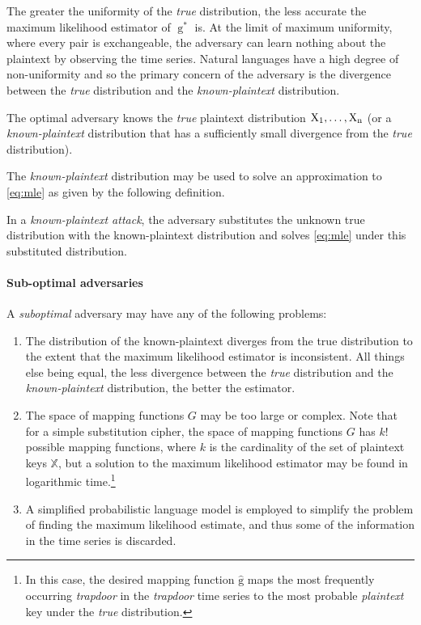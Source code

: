 \documentclass[ ../main.tex]{subfiles}
\begin{document}
The greater the uniformity of the \emph{true} distribution, the less accurate the maximum likelihood estimator of $\operatorname{g}^*$ is. At the limit of maximum uniformity, where every pair is exchangeable, the adversary can learn nothing about the plaintext by observing the time series. Natural languages have a high degree of non-uniformity and so the primary concern of the adversary is the divergence between the \emph{true} distribution and the \emph{known-plaintext} distribution.
\begin{assumption}
The optimal adversary knows the \emph{true} plaintext distribution $\mathrm{X_1},\ldots,\mathrm{X_n}$ (or a \emph{known-plaintext} distribution that has a sufficiently small divergence from the \emph{true} distribution).
\end{assumption}
The \emph{known-plaintext} distribution may be used to solve an approximation to \cref{eq:mle} as given by the following definition.
\begin{definition}
In a \emph{known-plaintext attack}, the adversary substitutes the unknown true distribution with the known-plaintext distribution and solves \cref{eq:mle} under this substituted distribution.
\end{definition}

\paragraph{Sub-optimal adversaries} A \emph{suboptimal} adversary may have any of the following problems:
\begin{enumerate}
    \item The distribution of the known-plaintext diverges from the true distribution to the extent that the maximum likelihood estimator is inconsistent. All things else being equal, the less divergence between the \emph{true} distribution and the \emph{known-plaintext} distribution, the better the estimator. 
    \item The space of mapping functions $G$ may be too large or complex. Note that for a simple substitution cipher, the space of mapping functions $G$ has $k!$ possible mapping functions, where $k$ is the cardinality of the set of plaintext keys $\mathbb{X}$, but a solution to the maximum likelihood estimator may be found in logarithmic time.\footnote{In this case, the desired mapping function $\operatorname{\hat{g}}$ maps the \jth most frequently occurring \emph{trapdoor} in the \emph{trapdoor} time series to the \jth most probable \emph{plaintext} key under the \emph{true} distribution.}
    \item A simplified probabilistic language model is employed to simplify the problem of finding the maximum likelihood estimate, and thus some of the information in the time series is discarded.
\end{enumerate}
\end{document}

